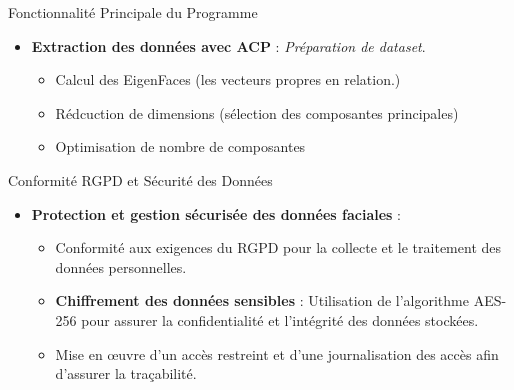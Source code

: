 \documentclass{beamer}
\begin{document}
\begin{frame}{Fonctionnalité Principale du Programme}
    \begin{itemize}
        \item \textbf{Extraction des données avec ACP} : \textit{Préparation de dataset}.
        \begin{itemize}
            \item Calcul des EigenFaces (les vecteurs propres en relation.)
            \item Rédcuction de dimensions (sélection des composantes principales)
            \item Optimisation de nombre de composantes
        \end{itemize}
    \end{itemize}
\end{frame}

\begin{frame}{Conformité RGPD et Sécurité des Données}
    \begin{itemize}
        \item \textbf{Protection et gestion sécurisée des données faciales} :
        \begin{itemize}
            \item Conformité aux exigences du RGPD pour la collecte et le traitement des données personnelles.
            \item \textbf{Chiffrement des données sensibles} : Utilisation de l'algorithme AES-256 pour assurer la confidentialité et l'intégrité des données stockées.
            \item Mise en œuvre d’un accès restreint et d’une journalisation des accès afin d’assurer la traçabilité.
        \end{itemize}
        
    \end{itemize}
\end{frame}
\end{document}
